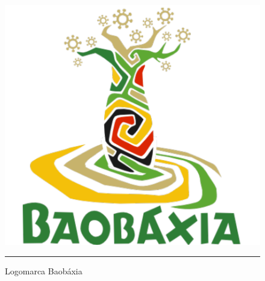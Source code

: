 \begin{itemize}
\begin{figure}[htbp]
  \centering
  \includegraphics[width=\textwidth]{./Fig/Logo_BBX.pdf}
  \rule{35em}{0.5pt}
  \caption[Logomarca Baobáxia]{Logomarca Baobáxia}
  \label{fig:Logo_BBX}
\end{figure}


\end{itemize}
